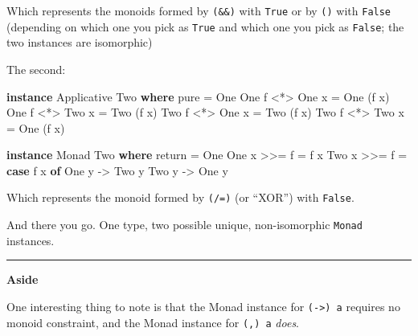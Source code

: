 \documentclass[]{article}
\newenvironment{Shaded}{\begin{snugshade}}{\end{snugshade}}
\newcommand{\DataTypeTok}[1]{\textcolor[rgb]{0.13,0.29,0.53}{#1}}
\newcommand{\FunctionTok}[1]{\textcolor[rgb]{0.00,0.00,0.00}{#1}}
\newcommand{\KeywordTok}[1]{\textcolor[rgb]{0.13,0.29,0.53}{\textbf{#1}}}
\newcommand{\NormalTok}[1]{#1}
\newcommand{\OtherTok}[1]{\textcolor[rgb]{0.56,0.35,0.01}{#1}}
\begin{document}
Which represents the monoids formed by \texttt{(\&\&)} with \texttt{True} or by
\texttt{(\textbar{}\textbar{})} with \texttt{False} (depending on which one you
pick as \texttt{True} and which one you pick as \texttt{False}; the two
instances are isomorphic)

The second:

\begin{Shaded}
\begin{Highlighting}[]
\KeywordTok{instance} \DataTypeTok{Applicative} \DataTypeTok{Two} \KeywordTok{where}
\NormalTok{    pure }\FunctionTok{=} \DataTypeTok{One}
    \DataTypeTok{One}\NormalTok{ f }\FunctionTok{<*>} \DataTypeTok{One}\NormalTok{ x }\FunctionTok{=} \DataTypeTok{One}\NormalTok{ (f x)}
    \DataTypeTok{One}\NormalTok{ f }\FunctionTok{<*>} \DataTypeTok{Two}\NormalTok{ x }\FunctionTok{=} \DataTypeTok{Two}\NormalTok{ (f x)}
    \DataTypeTok{Two}\NormalTok{ f }\FunctionTok{<*>} \DataTypeTok{One}\NormalTok{ x }\FunctionTok{=} \DataTypeTok{Two}\NormalTok{ (f x)}
    \DataTypeTok{Two}\NormalTok{ f }\FunctionTok{<*>} \DataTypeTok{Two}\NormalTok{ x }\FunctionTok{=} \DataTypeTok{One}\NormalTok{ (f x)}

\KeywordTok{instance} \DataTypeTok{Monad} \DataTypeTok{Two} \KeywordTok{where}
\NormalTok{    return }\FunctionTok{=} \DataTypeTok{One}
    \DataTypeTok{One}\NormalTok{ x }\FunctionTok{>>=}\NormalTok{ f }\FunctionTok{=}\NormalTok{ f x}
    \DataTypeTok{Two}\NormalTok{ x }\FunctionTok{>>=}\NormalTok{ f }\FunctionTok{=} \KeywordTok{case}\NormalTok{ f x }\KeywordTok{of}
                    \DataTypeTok{One}\NormalTok{ y }\OtherTok{->} \DataTypeTok{Two}\NormalTok{ y}
                    \DataTypeTok{Two}\NormalTok{ y }\OtherTok{->} \DataTypeTok{One}\NormalTok{ y}
\end{Highlighting}
\end{Shaded}

Which represents the monoid formed by \texttt{(/=)} (or ``XOR'') with
\texttt{False}.

And there you go. One type, two possible unique, non-isomorphic \texttt{Monad}
instances.

\begin{center}\rule{0.5\linewidth}{\linethickness}\end{center}

\textbf{Aside}

One interesting thing to note is that the Monad instance for
\texttt{(-\textgreater{})\ a} requires no monoid constraint, and the Monad
instance for \texttt{(,)\ a} \emph{does}.
\end{document}
